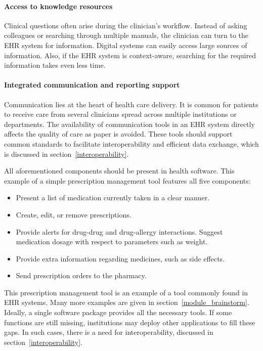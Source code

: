     \paragraph{Access to knowledge resources} Clinical questions often arise during the clinician's workflow. Instead of asking colleagues or searching through multiple manuals, the clinician can turn to the EHR system for information. Digital systems can easily access large sources of information. Also, if the EHR system is context-aware, searching for the required information takes even less time. 

    \paragraph{Integrated communication and reporting support} Communication lies at the heart of health care delivery. It is common for patients to receive care from several clinicians spread across multiple institutions or departments. The availability of communication tools in an EHR system directly affects the quality of care as paper is avoided. These tools should support common standards to facilitate interoperability and efficient data exchange, which is discussed in section~\ref{interoperability}.\bigskip

    \noindent All aforementioned components should be present in health software. This example of a simple prescription management tool features all five components:
    \begin{itemize}
        \item Present a list of medication currently taken in a clear manner.
        \item Create, edit, or remove prescriptions.
        \item Provide alerts for drug-drug and drug-allergy interactions. Suggest medication dosage with respect to parameters such as weight.
        \item Provide extra information regarding medicines, such as side effects.
        \item Send prescription orders to the pharmacy.
    \end{itemize}

    \noindent This prescription management tool is an example of a tool commonly found in EHR systems. Many more examples are given in section~\ref{module_brainstorm}. Ideally, a single software package provides all the necessary tools. If some functions are still missing, institutions may deploy other applications to fill these gaps. In such cases, there is a need for interoperability, discussed in section~\ref{interoperability}.

